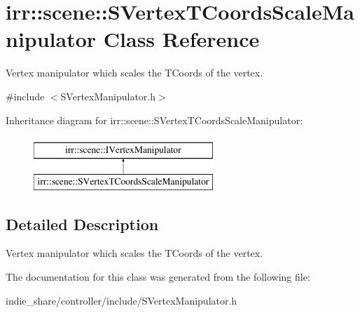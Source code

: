 \hypertarget{classirr_1_1scene_1_1SVertexTCoordsScaleManipulator}{}\section{irr\+:\+:scene\+:\+:S\+Vertex\+T\+Coords\+Scale\+Manipulator Class Reference}
\label{classirr_1_1scene_1_1SVertexTCoordsScaleManipulator}


Vertex manipulator which scales the T\+Coords of the vertex.  




{\ttfamily \#include $<$S\+Vertex\+Manipulator.\+h$>$}

Inheritance diagram for irr\+:\+:scene\+:\+:S\+Vertex\+T\+Coords\+Scale\+Manipulator\+:\begin{figure}[H]
\begin{center}
\leavevmode
\includegraphics[height=2.000000cm]{classirr_1_1scene_1_1SVertexTCoordsScaleManipulator}
\end{center}
\end{figure}


\subsection{Detailed Description}
Vertex manipulator which scales the T\+Coords of the vertex. 

The documentation for this class was generated from the following file\+:\begin{DoxyCompactItemize}
\item 
indie\+\_\+share/controller/include/S\+Vertex\+Manipulator.\+h\end{DoxyCompactItemize}
